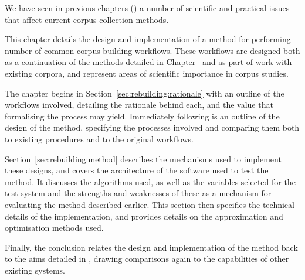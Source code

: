

We have seen in previous chapters () a number of scientific and practical issues that affect current corpus collection methods.

This chapter details the design and implementation of a method for performing number of common corpus building workflows.  These workflows are designed both as a continuation of the methods detailed in Chapter~ and as part of work with existing corpora, and represent areas of scientific importance in corpus studies.




The chapter begins in Section~\ref{sec:rebuilding:rationale} with an outline of the workflows involved, detailing the rationale behind each, and the value that formalising the process may yield.  Immediately following is an outline of the design of the method, specifying the processes involved and comparing them both to existing procedures and to the original workflows.

Section~\ref{sec:rebuilding:method} describes the mechanisms used to implement these designs, and covers the architecture of the software used to test the method.  It discusses the algorithms used, as well as the variables selected for the test system and the strengths and weaknesses of these as a mechanism for evaluating the method described earlier.  This section then specifies the technical details of the implementation, and provides details on the approximation and optimisation methods used.  

Finally, the conclusion relates the design and implementation of the method back to the aims detailed in , drawing comparisons again to the capabilities of other existing systems.
